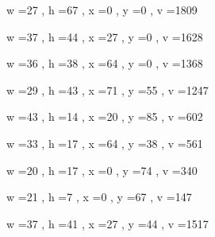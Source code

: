 \documentclass[11pt]{article}
\begin{document}
w =27 , h =67 , x =0 , y =0 , v =1809
\par
w =37 , h =44 , x =27 , y =0 , v =1628
\par
w =36 , h =38 , x =64 , y =0 , v =1368
\par
w =29 , h =43 , x =71 , y =55 , v =1247
\par
w =43 , h =14 , x =20 , y =85 , v =602
\par
w =33 , h =17 , x =64 , y =38 , v =561
\par
w =20 , h =17 , x =0 , y =74 , v =340
\par
w =21 , h =7 , x =0 , y =67 , v =147
\par
w =37 , h =41 , x =27 , y =44 , v =1517
\par
\newpage
\end{document}
